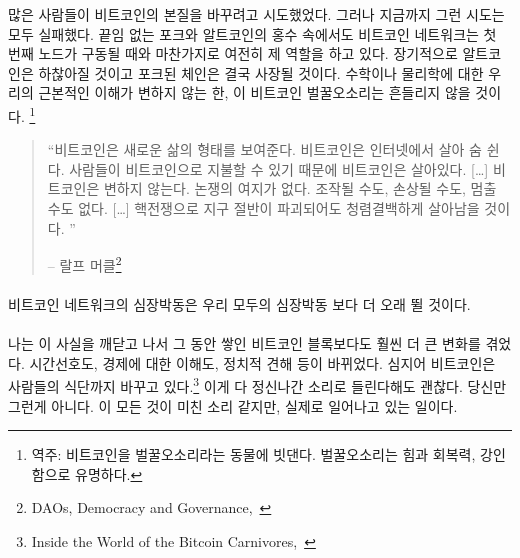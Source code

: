 많은 사람들이 비트코인의 본질을 바꾸려고 시도했었다. 그러나 지금까지 그런 시도는 모두 실패했다. 
끝임 없는 포크와 알트코인의 홍수 속에서도 비트코인 네트워크는 첫 번째 노드가 구동될 때와 마찬가지로 여전히 제 역할을 하고 있다.
장기적으로 알트코인은 하찮아질 것이고 포크된 체인은 결국 사장될 것이다.
수학이나 물리학에 대한 우리의 근본적인 이해가 변하지 않는 한, 이 비트코인 벌꿀오소리는 흔들리지 않을 것이다.
\footnote{역주: 비트코인을 벌꿀오소리라는 동물에 빗댄다. 벌꿀오소리는 힘과 회복력, 강인함으로 유명하다.}

\begin{quotation}\begin{samepage}
		\enquote{비트코인은 새로운 삶의 형태를 보여준다. 비트코인은 인터넷에서 살아 숨 쉰다. 
		사람들이 비트코인으로 지불할 수 있기 때문에 비트코인은 살아있다. [\ldots] 비트코인은 변하지 않는다. 논쟁의 여지가 없다.
		조작될 수도, 손상될 수도, 멈출 수도 없다. [\ldots] 핵전쟁으로 지구 절반이 파괴되어도 청렴결백하게 살아남을 것이다. }
		\begin{flushright} -- 랄프 머클\footnote{DAOs, Democracy and Governance,~\cite{merkle-dao}}
\end{flushright}\end{samepage}\end{quotation}

\paragraph{}
비트코인 네트워크의 심장박동은 우리 모두의 심장박동 보다 더 오래 뛸 것이다.

\paragraph{}
나는 이 사실을 깨닫고 나서 그 동안 쌓인 비트코인 블록보다도 훨씬 더 큰 변화를 겪었다.
시간선호도, 경제에 대한 이해도, 정치적 견해 등이 바뀌었다. 
심지어 비트코인은 사람들의 식단까지 바꾸고 있다.\footnote{Inside the World of the Bitcoin Carnivores,~\cite{carnivores}} 
이게 다 정신나간 소리로 들린다해도 괜찮다. 당신만 그런게 아니다.
이 모든 것이 미친 소리 같지만, 실제로 일어나고 있는 일이다.

